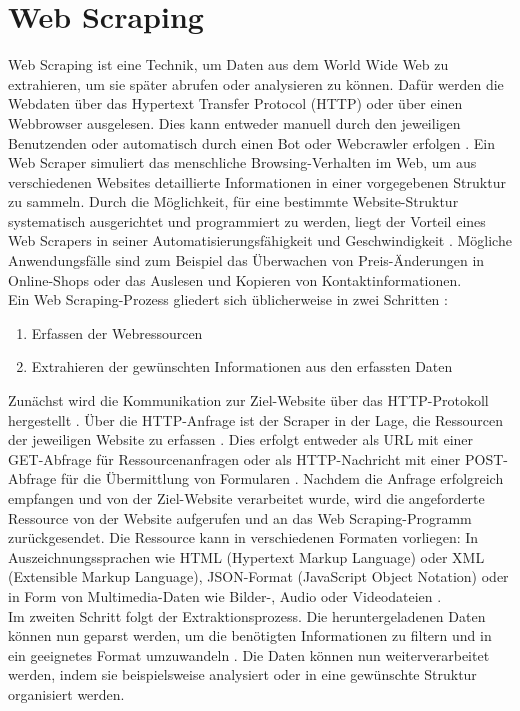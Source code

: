 \documentclass[german,bachelor]{swsLeipzig}
\begin{document}
\section{Web Scraping}
Web Scraping ist eine Technik, um Daten aus dem World Wide Web zu extrahieren, um sie später abrufen oder analysieren zu können.
Dafür werden die Webdaten über das Hypertext Transfer Protocol (HTTP) oder über einen Webbrowser ausgelesen.
Dies kann entweder manuell durch den jeweiligen Benutzenden oder automatisch durch einen Bot oder Webcrawler erfolgen \cite[]{zhao2017web}.
Ein Web Scraper simuliert das menschliche Browsing-Verhalten im Web, um aus verschiedenen Websites
detaillierte Informationen in einer vorgegebenen Struktur zu sammeln.
Durch die Möglichkeit, für eine bestimmte Website-Struktur systematisch ausgerichtet und programmiert zu werden, liegt der Vorteil
eines Web Scrapers in seiner Automatisierungsfähigkeit und Geschwindigkeit \cite[]{9005594}.
Mögliche Anwendungsfälle sind zum Beispiel das Überwachen von Preis-Änderungen in Online-Shops oder das Auslesen und Kopieren
von Kontaktinformationen.\\

Ein Web Scraping-Prozess gliedert sich üblicherweise in zwei Schritten \cite[]{zhao2017web}:
\begin{enumerate}
 \item Erfassen der Webressourcen
 \item Extrahieren der gewünschten Informationen aus den erfassten Daten
\end{enumerate}
Zunächst wird die Kommunikation zur Ziel-Website über das HTTP-Protokoll hergestellt \cite[]{10.1093/bib/bbt026}.
Über die HTTP-Anfrage ist der Scraper in der Lage, die Ressourcen der jeweiligen Website zu erfassen \cite[]{zhao2017web}.
Dies erfolgt entweder als URL mit einer GET-Abfrage für Ressourcenanfragen oder als HTTP-Nachricht mit einer
POST-Abfrage für die Übermittlung von Formularen \cite[]{10.1093/bib/bbt026}.
Nachdem die Anfrage erfolgreich empfangen und von der Ziel-Website verarbeitet wurde, wird die angeforderte Ressource
von der Website aufgerufen und an das Web Scraping-Programm zurückgesendet.
Die Ressource kann in verschiedenen Formaten vorliegen:
In Auszeichnungssprachen wie HTML (Hypertext Markup Language) oder XML (Extensible Markup Language), JSON-Format
(JavaScript Object Notation) oder in Form von Multimedia-Daten wie Bilder-, Audio oder Videodateien \cite[]{zhao2017web}.\\

Im zweiten Schritt folgt der Extraktionsprozess.
Die heruntergeladenen Daten können nun geparst werden, um die benötigten Informationen zu filtern und in ein geeignetes Format
umzuwandeln \cite[]{10.1093/bib/bbt026}.
Die Daten können nun weiterverarbeitet werden, indem sie beispielsweise analysiert oder in eine gewünschte Struktur
organisiert werden.\\
\end{document}
